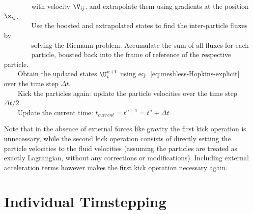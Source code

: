 {\indent~~~~~~~~with velocity $\V_{ij}$, and extrapolate them using gradients at the position
$\x_{ij}$.\\[.5em]
%
\indent~~~~~~~~Use the boosted and extrapolated states to find the inter-particle fluxes by \\
\indent~~~~~~~~solving the Riemann problem. Accumulate the sum of all fluxes for each \\
\indent~~~~~~~~particle, boosted back into the frame of reference of the respective
particle.\\[.5em]
%
\indent~~~~Obtain the updated states $\U_i^{n+1}$ using eq.~\ref{eq:meshless-Hopkins-explicit} over
the time step $\Delta t$.\\[.5em]
%
\indent~~~~Kick the particles again: update the particle velocities over the time step $\Delta
t/2$.\\[.5em]
%
\indent~~~~Update the current time: $t_{current} = t^{n+1} = t^n + \Delta t$ \\
}


Note that in the absence of external forces like gravity the first kick operation is unnecessary,
while the second kick operation consists of directly setting the particle velocities to the fluid
velocities (assuming the particles are treated as exactly Lagrangian, without any corrections or
modifications). Including external acceleration terms however makes the first kick operation
necessary again.








\section{Individual Timstepping}\label{chap:individual-timesteps}



